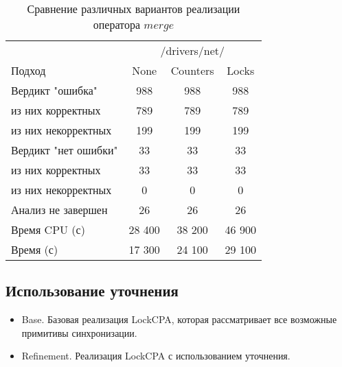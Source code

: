 \begin{center}
  \begin{table}[h]\footnotesize
  	\label{table-drivers-lock-merge}
    \caption{Сравнение различных вариантов реализации оператора $merge$}
    \begin{tabular}{ | l | c | c | c | }
      \hline
      		& 		 \multicolumn{3}{|c|}{/drivers/net/} \\
      Подход         				& None 	& Counters 	& Locks  \\ \hline
      Вердикт "ошибка" 				& 988   & 988       & 988       \\ 
  \hspace{0.5cm} из них корректных 	& 789 	& 789 		& 789     \\ 
  \hspace{0.5cm} из них некорректных & 199 	& 199 		& 199       \\ \hline
      Вердикт "нет ошибки"  		& 33    & 33        & 33      \\ 
  \hspace{0.5cm} из них корректных 	& 33 	& 33    	& 33      \\
  \hspace{0.5cm} из них некорректных & 0 	& 0    		& 0     \\ \hline
      Анализ не завершен       		& 26    & 26        & 26    \\ \hline
      Время CPU (с)   				& 28 400 & 38 200   & 46 900    \\ 
      Время (с)  					& 17 300 & 24 100   & 29 100      \\
      \hline
    \end{tabular}
  \end{table}
\end{center}

\subsection{Использование уточнения}

\begin{itemize}
\item Base. Базовая реализация LockCPA, которая рассматривает все возможные примитивы синхронизации.
\item Refinement. Реализация LockCPA с использованием уточнения.
\end{itemize}

